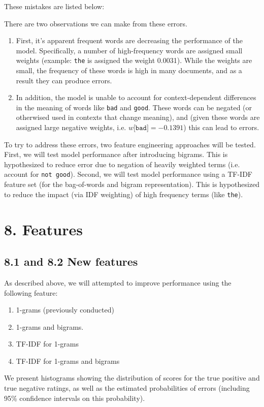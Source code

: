 \documentclass[paper=a4, fontsize=11pt]{scrartcl} %
\numberwithin{equation}{section} %
\numberwithin{figure}{section} %
\numberwithin{table}{section} %
\begin{document}
These mistakes are listed below:
\begin{center}

\end{center}

There are two observations we can make from these errors.
\begin{enumerate}
\item First, it's apparent frequent words are decreasing the performance of the model. Specifically, a number of high-frequency words are assigned small weights (example: \texttt{the} is assigned the weight 0.0031). While the weights are small, the frequency of these words is high in many documents, and as a result they can produce errors.
\item In addition, the model is unable to account for context-dependent differences in the meaning of words like \texttt{bad} and \texttt{good}. These words can be negated (or otherwised used in contexts that change meaning), and (given these words are assigned large negative weights, i.e. $w\texttt{[bad]} = -0.1391$) this can lead to errors.
\end{enumerate}

To try to address these errors, two feature engineering approaches will be tested. First, we will test model performance after introducing bigrams. This is hypothesized to reduce error due to negation of heavily weighted terms (i.e. account for \texttt{not good}). Second, we will test model performance using a TF-IDF feature set (for the bag-of-words and bigram representation). This is hypothesized to reduce the impact (via IDF weighting) of high frequency terms (like \texttt{the}).




\section*{8. Features}

\subsection*{8.1 and 8.2 New features}

As described above, we will attempted to improve performance using the following feature:
\begin{enumerate}
\item 1-grams (previously conducted)
\item 1-grams and bigrams.
\item TF-IDF for 1-grams
\item TF-IDF for 1-grams and bigrams
\end{enumerate}
We present histograms showing the distribution of scores for the true positive and true negative ratings, as well as the estimated probabilities of errors (including 95\% confidence intervals on this probability).
\end{document}
